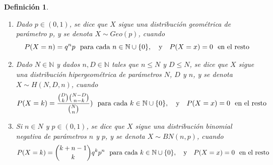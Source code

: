 \documentclass[11pt]{report}
\newtheorem{definition}{Definición}
\theoremstyle{definition}
\newcommand{\N}{\mathbb N}
\begin{document}
\begin{definition}
\begin{enumerate}
    \[P(X = k) = e^{-\lambda}\frac{\lambda^k}{k!} \ \ \textup{para cada } k \in \N\cup \{0\}, \quad \textup{y} \quad P(X = x)=0 \ \ \textup{en el resto}\]
    \item Dado $p \in (0,1)$, se dice que $X$ sigue una \emph{distribución geométrica de parámetro $p$}, y se denota $X \sim Geo(p)$, cuando
    \[P(X= n ) = q^np \ \ \textup{para cada } n \in \N \cup \{0\}, \quad \textup{y} \quad P(X = x)=0 \ \ \textup{en el resto}\]
    \item Dado $N \in \N$ y dados $n,D \in \N$ tales que $n \leq N$ y $D \leq N$, se dice que $X$ sigue una \emph{distribución hipergeométrica de parámetros $N$, $D$ y $n$}, y se denota $X \sim H(N,D,n)$, cuando
    \[P(X= k)=\frac{\binom{D}{k}\binom{N-D}{n-k}}{\binom{N}{n}} ) \ \ \textup{para cada } k \in \N \cup \{0\}, \quad \textup{y} \quad P(X = x)=0 \ \ \textup{en el resto}\]
    \item Si $n \in N$ y $p \in (0,1)$, se dice que $X$ sigue una \emph{distribución binomial negativa de parámetros $n$ y $p$}, y se denota $X \sim BN(n,p)$, cuando
    \[P(X= k)=\binom{k+n-1}{k}q^kp^n \ \ \textup{para cada } k \in \N \cup \{0\}, \quad \textup{y} \quad P(X = x)=0 \ \ \textup{en el resto}\]
\end{enumerate}
\end{definition}
\end{document}
